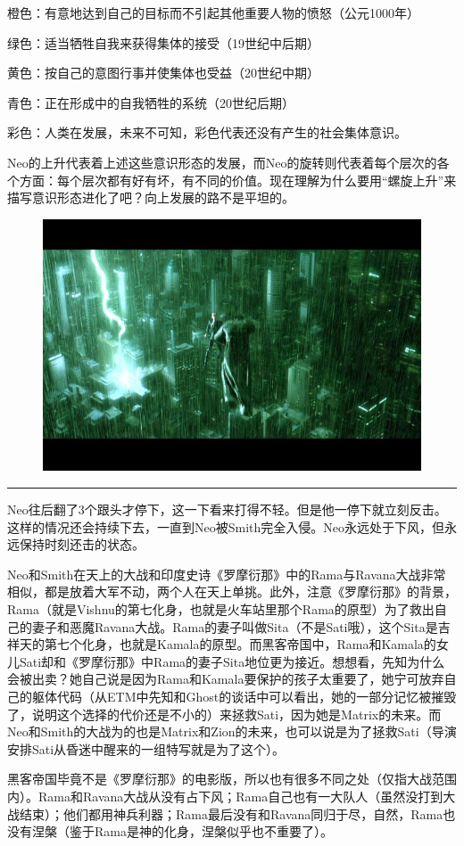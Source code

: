\documentclass[UTF8]{ctexart}
\newcommand{\myparsep}{\noindent \rule[0.5ex]{\linewidth}{1pt}}
\begin{document}
橙色：有意地达到自己的目标而不引起其他重要人物的愤怒（公元1000年）

绿色：适当牺牲自我来获得集体的接受（19世纪中后期）

黄色：按自己的意图行事并使集体也受益（20世纪中期）

青色：正在形成中的自我牺牲的系统（20世纪后期）

彩色：人类在发展，未来不可知，彩色代表还没有产生的社会集体意识。

Neo的上升代表着上述这些意识形态的发展，而Neo的旋转则代表着每个层次的各个方面：每个层次都有好有坏，有不同的价值。现在理解为什么要用“螺旋上升”来描写意识形态进化了吧？向上发展的路不是平坦的。

\begin{figure}[htb]
\centering
\includegraphics[width=0.5\linewidth]{fig/b45db90ebee77ae436d12215.jpg}
\end{figure}

\myparsep

Neo往后翻了3个跟头才停下，这一下看来打得不轻。但是他一停下就立刻反击。这样的情况还会持续下去，一直到Neo被Smith完全入侵。Neo永远处于下风，但永远保持时刻还击的状态。

Neo和Smith在天上的大战和印度史诗《罗摩衍那》中的Rama与Ravana大战非常相似，都是放着大军不动，两个人在天上单挑。此外，注意《罗摩衍那》的背景，Rama（就是Vishnu的第七化身，也就是火车站里那个Rama的原型）为了救出自己的妻子和恶魔Ravana大战。Rama的妻子叫做Sita（不是Sati哦），这个Sita是吉祥天的第七个化身，也就是Kamala的原型。而黑客帝国中，Rama和Kamala的女儿Sati却和《罗摩衍那》中Rama的妻子Sita地位更为接近。想想看，先知为什么会被出卖？她自己说是因为Rama和Kamala要保护的孩子太重要了，她宁可放弃自己的躯体代码（从ETM中先知和Ghost的谈话中可以看出，她的一部分记忆被摧毁了，说明这个选择的代价还是不小的）来拯救Sati，因为她是Matrix的未来。而Neo和Smith的大战为的也是Matrix和Zion的未来，也可以说是为了拯救Sati（导演安排Sati从昏迷中醒来的一组特写就是为了这个）。

黑客帝国毕竟不是《罗摩衍那》的电影版，所以也有很多不同之处（仅指大战范围内）。Rama和Ravana大战从没有占下风；Rama自己也有一大队人（虽然没打到大战结束）；他们都用神兵利器；Rama最后没有和Ravana同归于尽，自然，Rama也没有涅槃（鉴于Rama是神的化身，涅槃似乎也不重要了）。
\end{document}
